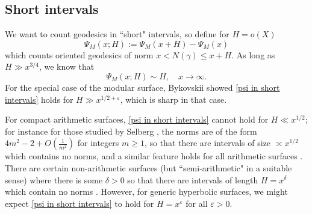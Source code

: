 \documentclass[12pt]{amsart}
\begin{document}
 
 

 


 \subsection{Short intervals}
We want to count geodesics in ``short" intervals, so define for $H=o(X)$   
\[
\Psi_M(x;H):=\Psi_M(x+H)-\Psi_M(x)
\]
which counts oriented geodesics of norm $x<N(\gamma)\le x+H$. As long as $H\gg  x^{3/4}$,    
we know that 
\begin{equation}\label{psi in short intervals}
 \Psi_M(x;H)\sim H, \quad x\to \infty.  
\end{equation}
For the special case of the modular surface, Bykovskii \cite{Bykovskii} showed \eqref{psi in short intervals} holds for $H\gg x^{1/2+\varepsilon}$, which is sharp in that case.  

For  compact arithmetic surfaces,  \eqref{psi in short intervals} cannot hold for $H\ll x^{1/2}$; for instance for those studied by Selberg \cite[Chapter 18]{Hejhal STF1}, the norms are of the form $4m^2-2 + O\left( \frac 1{m^2} \right)$ for integers $m\geq 1$,  so that there are intervals of size $\asymp x^{1/2}$ which contains no norms, and  a similar feature holds for all arithmetic surfaces \cite{LuoSarnak}.  There are certain non-arithmetic  surfaces (but ``semi-arithmetic" in a suitable sense) where there is  some $\delta>0$ so that there are intervals of length $H=x^\delta$ which contain no norms \cite{BGGS97, BS04, Belolipetskytal}.  
However,  for  generic hyperbolic surfaces, we might expect \eqref{psi in short intervals} to hold  for   $H= x^\varepsilon $ for all $\varepsilon>0$.  



\end{document}
